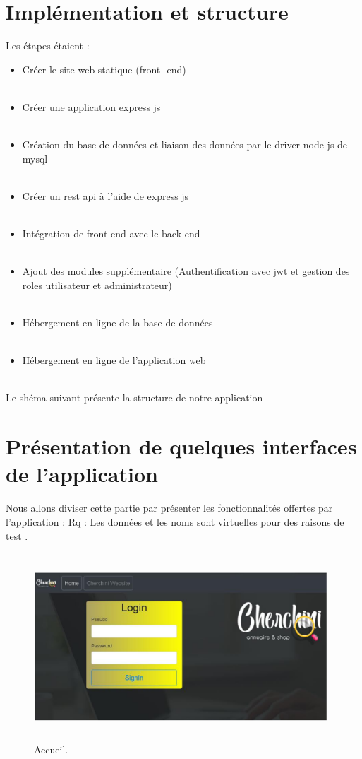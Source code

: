 \section{Impl\'{e}mentation et structure}

Les \'{e}tapes \'{e}taient :
\bigskip

\begin{itemize}
\item{ Cr\'{e}er le site web statique (front -end) }
\\~~
\item{Cr\'{e}er une application express js }
\\~~
\item{  Cr\'{e}ation du base de donn\'{e}es et liaison des donn\'{e}es par le driver node js
de mysql}
\\~~
\item{Cr\'{e}er un rest api \`{a} l'aide de express js }
\\~~
\item{Int\'{e}gration de front-end avec le back-end }
\\~~
\item{Ajout des modules suppl\'{e}mentaire (Authentification avec jwt et gestion
des roles utilisateur et administrateur) }
\\~~
\item{ H\'{e}bergement en ligne de la base de donn\'{e}es}
\\~~
\item{ H\'{e}bergement en ligne de l'application web}
\\~~
\end{itemize}


Le sh\'{e}ma suivant pr\'{e}sente la structure de notre application






\section{Pr\'{e}sentation de quelques interfaces de l'application}
Nous allons diviser cette partie par pr\'{e}senter les fonctionnalit\'{e}s offertes par
l'application :
Rq : Les donn\'{e}es et les noms sont virtuelles pour des raisons de test .

\FloatBarrier
\begin{figure}[H]
\center
\includegraphics[width=11cm,height=7cm]{./figures/pres/1.png}
\caption{Accueil.}

\end{figure}
\FloatBarrier

